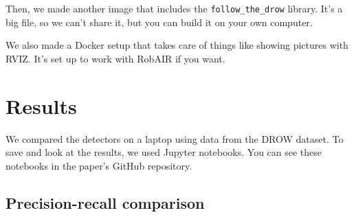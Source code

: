 \documentclass{article}
\begin{document}
Then, we made another image that includes the \texttt{follow\_the\_drow} library.
It's a big file, so we can't share it, but you can build it on your own computer.

We also made a Docker setup that takes care of things like showing pictures with RVIZ.
It's set up to work with RobAIR if you want.

\section{Results}

We compared the detectors on a laptop using data from the DROW dataset.
To save and look at the results, we used Jupyter notebooks.
You can see these notebooks in the paper's GitHub repository\cite{FTD_comparison}.

\subsection{Precision-recall comparison}
\end{document}
